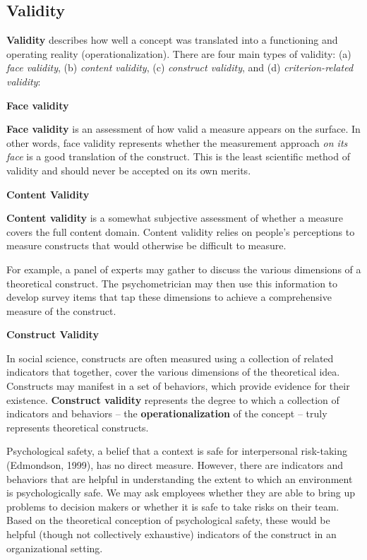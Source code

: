 \documentclass[
]{book}
\begin{document}
\hypertarget{validity}{%
\subsection{Validity}\label{validity}}

\textbf{Validity} describes how well a concept was translated into a functioning and operating reality (operationalization). There are four main types of validity: (a) \emph{face validity}, (b) \emph{content validity}, (c) \emph{construct validity}, and (d) \emph{criterion-related validity}:

\textbf{Face validity}

\textbf{Face validity} is an assessment of how valid a measure appears on the surface. In other words, face validity represents whether the measurement approach \emph{on its face} is a good translation of the construct. This is the least scientific method of validity and should never be accepted on its own merits.

\textbf{Content Validity}

\textbf{Content validity} is a somewhat subjective assessment of whether a measure covers the full content domain. Content validity relies on people's perceptions to measure constructs that would otherwise be difficult to measure.

For example, a panel of experts may gather to discuss the various dimensions of a theoretical construct. The psychometrician may then use this information to develop survey items that tap these dimensions to achieve a comprehensive measure of the construct.

\textbf{Construct Validity}

In social science, constructs are often measured using a collection of related indicators that together, cover the various dimensions of the theoretical idea. Constructs may manifest in a set of behaviors, which provide evidence for their existence. \textbf{Construct validity} represents the degree to which a collection of indicators and behaviors -- the \textbf{operationalization} of the concept -- truly represents theoretical constructs.

Psychological safety, a belief that a context is safe for interpersonal risk-taking (Edmondson, 1999), has no direct measure. However, there are indicators and behaviors that are helpful in understanding the extent to which an environment is psychologically safe. We may ask employees whether they are able to bring up problems to decision makers or whether it is safe to take risks on their team. Based on the theoretical conception of psychological safety, these would be helpful (though not collectively exhaustive) indicators of the construct in an organizational setting.
\end{document}
